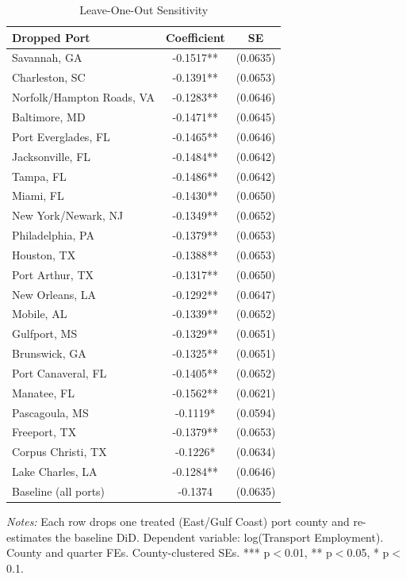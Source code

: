 \begin{table}[htbp]
\centering
\caption{Leave-One-Out Sensitivity}
\label{tab:loo}
\begin{tabular}{lcc}
\hline\hline
Dropped Port & Coefficient & SE \\
\hline
Savannah, GA & -0.1517** & (0.0635) \\
Charleston, SC & -0.1391** & (0.0653) \\
Norfolk/Hampton Roads, VA & -0.1283** & (0.0646) \\
Baltimore, MD & -0.1471** & (0.0645) \\
Port Everglades, FL & -0.1465** & (0.0646) \\
Jacksonville, FL & -0.1484** & (0.0642) \\
Tampa, FL & -0.1486** & (0.0642) \\
Miami, FL & -0.1430** & (0.0650) \\
New York/Newark, NJ & -0.1349** & (0.0652) \\
Philadelphia, PA & -0.1379** & (0.0653) \\
Houston, TX & -0.1388** & (0.0653) \\
Port Arthur, TX & -0.1317** & (0.0650) \\
New Orleans, LA & -0.1292** & (0.0647) \\
Mobile, AL & -0.1339** & (0.0652) \\
Gulfport, MS & -0.1329** & (0.0651) \\
Brunswick, GA & -0.1325** & (0.0651) \\
Port Canaveral, FL & -0.1405** & (0.0652) \\
Manatee, FL & -0.1562** & (0.0621) \\
Pascagoula, MS & -0.1119* & (0.0594) \\
Freeport, TX & -0.1379** & (0.0653) \\
Corpus Christi, TX & -0.1226* & (0.0634) \\
Lake Charles, LA & -0.1284** & (0.0646) \\
\hline
Baseline (all ports) & -0.1374 & (0.0635) \\
\hline\hline
\end{tabular}
\begin{tablenotes}[flushleft]
\small
\item \textit{Notes:} Each row drops one treated (East/Gulf Coast) port county and re-estimates the baseline DiD. Dependent variable: log(Transport Employment). County and quarter FEs. County-clustered SEs. *** p$<$0.01, ** p$<$0.05, * p$<$0.1.
\end{tablenotes}
\end{table}

